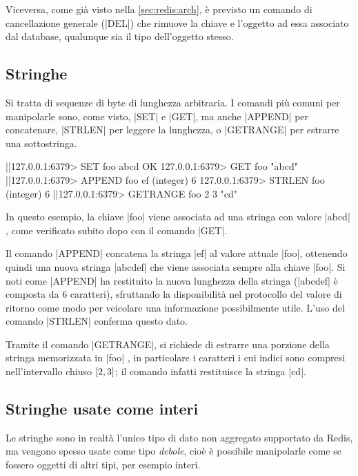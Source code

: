 Viceversa, come già visto nella \autoref{sec:redis:arch}, è previsto un comando di cancellazione
generale (\cverb|DEL|) che rimuove la chiave e l'oggetto ad essa associato dal database,
qualunque sia il tipo dell'oggetto stesso.


\subsection{Stringhe}

Si tratta di sequenze di byte di lunghezza arbitraria. I comandi
più comuni per manipolarle sono, come visto, \cverb|SET| e \cverb|GET|, ma anche \cverb|APPEND|
per concatenare, \cverb|STRLEN| per leggere la lunghezza, o \cverb|GETRANGE| per estrarre una
sottostringa.

\begin{commentedsource}[style=redis]
|\lnote|127.0.0.1:6379> SET foo abcd
OK
127.0.0.1:6379> GET foo
"abcd"
|\lnote|127.0.0.1:6379> APPEND foo ef
(integer) 6
127.0.0.1:6379> STRLEN foo
(integer) 6
|\lnote|127.0.0.1:6379> GETRANGE foo 2 3
"cd"
\end{commentedsource}

In questo esempio, la chiave \cverb|foo| viene associata ad una stringa con valore \cverb|abcd|
, come verificato subito dopo con il comando \cverb|GET|. 

Il comando \cverb|APPEND|  concatena la stringa \cverb|ef| al valore attuale \cverb|foo|,
ottenendo quindi una nuova stringa \cverb|abcdef| che viene associata sempre alla chiave \cverb|foo|.
Si noti come \cverb|APPEND| ha restituito la nuova lunghezza della stringa (\cverb|abcdef| è composta
da $6$ caratteri), sfruttando la disponibilità nel protocollo del valore di ritorno come modo per
veicolare una informazione possibilmente utile. L'uso del comando \cverb|STRLEN| conferma questo
dato.

Tramite il comando \cverb|GETRANGE|, si richiede di estrarre una porzione della stringa memorizzata
in \cverb|foo| , in particolare i caratteri i cui indici sono compresi nell'intervallo
chiuso $\interval{2}{3}$; il comando infatti restituisce la stringa \cverb|cd|.

\subsection{Stringhe usate come interi}

Le stringhe sono in realtà l'unico tipo di dato non aggregato supportato da Redis, ma vengono spesso
usate come tipo \emph{debole}, cioè è possibile manipolarle come se fossero oggetti di altri tipi,
per esempio interi.

